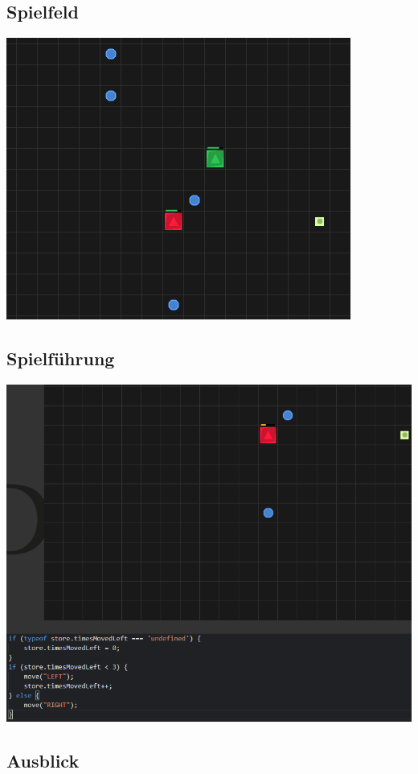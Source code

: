 \documentclass[11pt,a4paper,titlepage]{article}
\begin{document}
\subsection{Spielfeld}
\includegraphics[width=\textwidth]{game1.png}

\subsection{Spielführung}
\includegraphics[width=\textwidth]{game2.png}

\subsection{Ausblick}
\end{document}

